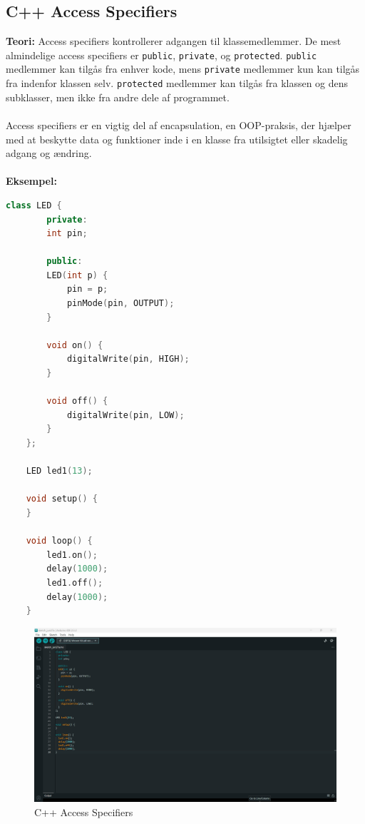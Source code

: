 \subsection{C++ Access Specifiers}
\textbf{Teori:} Access specifiers kontrollerer adgangen til klassemedlemmer. De mest almindelige access specifiers er \texttt{public}, \texttt{private}, og \texttt{protected}. \texttt{public} medlemmer kan tilgås fra enhver kode, mens \texttt{private} medlemmer kun kan tilgås fra indenfor klassen selv. \texttt{protected} medlemmer kan tilgås fra klassen og dens subklasser, men ikke fra andre dele af programmet.
\\\\
\noindent Access specifiers er en vigtig del af encapsulation, en OOP-praksis, der hjælper med at beskytte data og funktioner inde i en klasse fra utilsigtet eller skadelig adgang og ændring.
\\\\
\noindent\noindent\textbf{Eksempel:}
\begin{lstlisting}[language=C++]
	class LED {
		private:
		int pin;
		
		public:
		LED(int p) {
			pin = p;
			pinMode(pin, OUTPUT);
		}
		
		void on() {
			digitalWrite(pin, HIGH);
		}
		
		void off() {
			digitalWrite(pin, LOW);
		}
	};
	
	LED led1(13);
	
	void setup() {
	}
	
	void loop() {
		led1.on();
		delay(1000);
		led1.off();
		delay(1000);
	}
\end{lstlisting}
\begin{figure}[h!]
	\centering
	\includegraphics[width=\textwidth]{fig/fig16.png}
	\caption{C++ Access Specifiers}
	\label{fig:16}
\end{figure}

